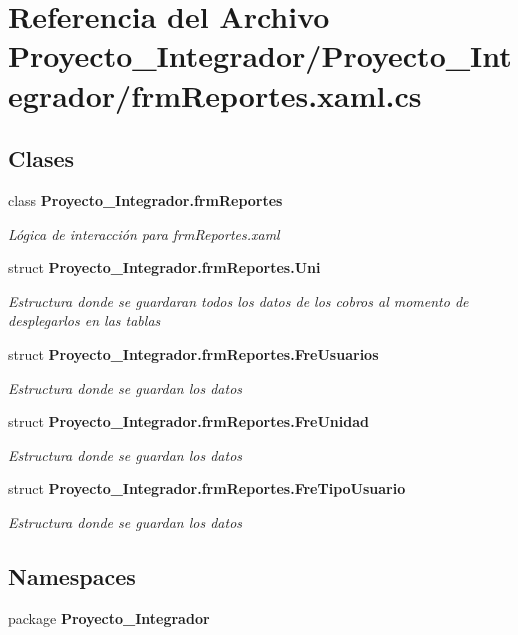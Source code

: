 \section{Referencia del Archivo Proyecto\-\_\-\-Integrador/\-Proyecto\-\_\-\-Integrador/frm\-Reportes.xaml.\-cs}
\label{frm_reportes_8xaml_8cs}
\subsection*{Clases}
\begin{DoxyCompactItemize}
\item 
class {\bf Proyecto\-\_\-\-Integrador.\-frm\-Reportes}
\begin{DoxyCompactList}\small\item\em Lógica de interacción para frm\-Reportes.\-xaml \end{DoxyCompactList}\item 
struct {\bf Proyecto\-\_\-\-Integrador.\-frm\-Reportes.\-Uni}
\begin{DoxyCompactList}\small\item\em Estructura donde se guardaran todos los datos de los cobros al momento de desplegarlos en las tablas \end{DoxyCompactList}\item 
struct {\bf Proyecto\-\_\-\-Integrador.\-frm\-Reportes.\-Fre\-Usuarios}
\begin{DoxyCompactList}\small\item\em Estructura donde se guardan los datos \end{DoxyCompactList}\item 
struct {\bf Proyecto\-\_\-\-Integrador.\-frm\-Reportes.\-Fre\-Unidad}
\begin{DoxyCompactList}\small\item\em Estructura donde se guardan los datos \end{DoxyCompactList}\item 
struct {\bf Proyecto\-\_\-\-Integrador.\-frm\-Reportes.\-Fre\-Tipo\-Usuario}
\begin{DoxyCompactList}\small\item\em Estructura donde se guardan los datos \end{DoxyCompactList}\end{DoxyCompactItemize}
\subsection*{Namespaces}
\begin{DoxyCompactItemize}
\item 
package {\bf Proyecto\-\_\-\-Integrador}
\end{DoxyCompactItemize}
